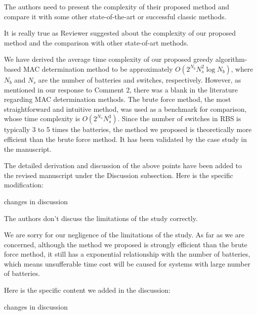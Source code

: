\begin{revcomment}
  The authors need to present the complexity of their proposed method and compare it with some other state-of-the-art or successful classic methods.
\end{revcomment}
\begin{revresponse}

It is really true as Reviewer suggested about the complexity of our proposed method and the comparison with other state-of-art methods.


We have derived the average time complexity of our proposed greedy algorithm-based MAC determination method to be approximately $O(2^{N_b}N_s^2\log N_b)$, where $N_b$ and $N_s$ are the number of batteries and switches, respectively.
However, as mentioned in our response to Comment 2, there was a blank in the literature regarding MAC determination methods.
The brute force method, the most straightforward and intuitive method, was used as a benchmark for comparison, whose time complexity is $O(2^{N_s}N_s^3)$.
Since the number of switches in RBS is typically 3 to 5 times the batteries\cite{ciNovelDesignAdaptive2007,alahmadBatterySwitchArray2008,kimDependableEfficientScalable2010b,kimBalancedReconfigurationStorage2011a,taesickimSeriesconnectedSelfreconfigurableMulticell2012a,6843711}, the method we proposed is theoretically more efficient than the brute force method.
It has been validated by the case study in the manuscript.


The detailed derivation and discussion of the above points have been added to the revised manuscript under the Discussion subsection.
Here is the specific modification:
\begin{changes}
  changes in discussion
\end{changes}

\end{revresponse}

\begin{revcomment}
  The authors don't discuss the limitations of the study correctly.
\end{revcomment}
\begin{revresponse}

We are sorry for our negligence of the limitations of the study. As far as we are concerned, although the method we proposed is strongly efficient than the brute force method, it still has a exponential relationship with the number of batteries, which means unsufferable time cost will be caused for systems with large number of batteries.


Here is the specific content we added in the discussion:
\begin{changes}
  changes in discussion
\end{changes}

\end{revresponse}



